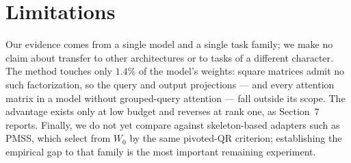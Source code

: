 \documentclass{article}
\begin{document}
\section{Limitations}
Our evidence comes from a single model and a single task family; we make no
claim about transfer to other architectures or to tasks of a different
character. The method touches only $1.4\%$ of the model's weights: square
matrices admit no such factorization, so the query and output projections ---
and every attention matrix in a model without grouped-query attention --- fall
outside its scope. The advantage exists only at low budget and reverses at
rank one, as Section~7 reports. Finally, we do not yet compare against
skeleton-based adapters such as PMSS, which select from $W_0$ by the same
pivoted-QR criterion; establishing the empirical gap to that family is the
most important remaining experiment.



\end{document}
